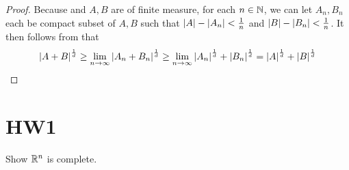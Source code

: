 \documentclass{report}
\begin{document}
\begin{proof}
Because  and $A,B$ are of finite measure, for each $n\in\mathbb{N}$, we can let $A_n,B_n$ each be compact subset of  $A,B$ such that $\left|A\right|-\left|A_n\right|<\frac{1}{n}$  and $\left|B\right|-\left|B_n\right|<\frac{1}{n}$. It then follows from  that 
\begin{align*}
\left|A+B\right|^{\frac{1}{d}}\geq \lim_{n\to \infty}\left|A_n+B_n\right|^{\frac{1}{d}}\geq \lim_{n\to \infty} \left|A_n\right|^{\frac{1}{d}}+ \left|B_n\right|^{\frac{1}{d}}=\left|A\right|^{\frac{1}{d}}+ \left|B\right|^{\frac{1}{d}}
\end{align*}
\end{proof}
\section{HW1}
\begin{question}{}{}
Show $\mathbb{R}^n$ is complete.
\end{question}
\end{document}
